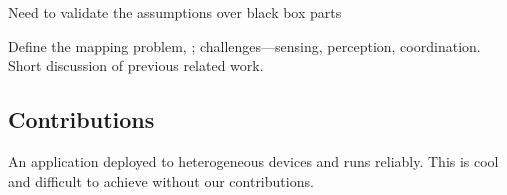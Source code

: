 Need to validate the assumptions over black box parts

%
Define the mapping problem, ; challenges---sensing, perception, coordination. Short discussion of previous related work.

%
%
\subsection{Contributions~}
An application deployed to heterogeneous devices and runs reliably.
This is cool and difficult to achieve without our contributions.
